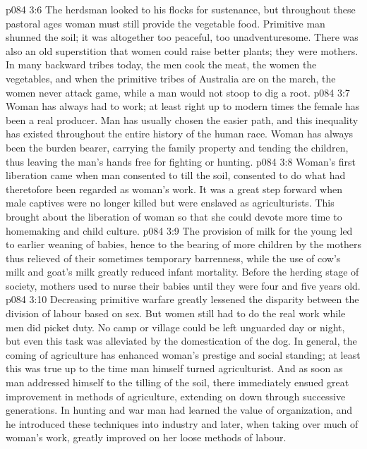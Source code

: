 \vs p084 3:6 \pc The herdsman looked to his flocks for sustenance, but throughout these pastoral ages woman must still provide the vegetable food. Primitive man shunned the soil; it was altogether too peaceful, too unadventuresome. There was also an old superstition that women could raise better plants; they were mothers. In many backward tribes today, the men cook the meat, the women the vegetables, and when the primitive tribes of Australia are on the march, the women never attack game, while a man would not stoop to dig a root.
\vs p084 3:7 Woman has always had to work; at least right up to modern times the female has been a real producer. Man has usually chosen the easier path, and this inequality has existed throughout the entire history of the human race. Woman has always been the burden bearer, carrying the family property and tending the children, thus leaving the man’s hands free for fighting or hunting.
\vs p084 3:8 Woman’s first liberation came when man consented to till the soil, consented to do what had theretofore been regarded as woman’s work. It was a great step forward when male captives were no longer killed but were enslaved as agriculturists. This brought about the liberation of woman so that she could devote more time to homemaking and child culture.
\vs p084 3:9 The provision of milk for the young led to earlier weaning of babies, hence to the bearing of more children by the mothers thus relieved of their sometimes temporary barrenness, while the use of cow’s milk and goat’s milk greatly reduced infant mortality. Before the herding stage of society, mothers used to nurse their babies until they were four and five years old.
\vs p084 3:10 Decreasing primitive warfare greatly lessened the disparity between the division of labour based on sex. But women still had to do the real work while men did picket duty. No camp or village could be left unguarded day or night, but even this task was alleviated by the domestication of the dog. In general, the coming of agriculture has enhanced woman’s prestige and social standing; at least this was true up to the time man himself turned agriculturist. And as soon as man addressed himself to the tilling of the soil, there immediately ensued great improvement in methods of agriculture, extending on down through successive generations. In hunting and war man had learned the value of organization, and he introduced these techniques into industry and later, when taking over much of woman’s work, greatly improved on her loose methods of labour.
